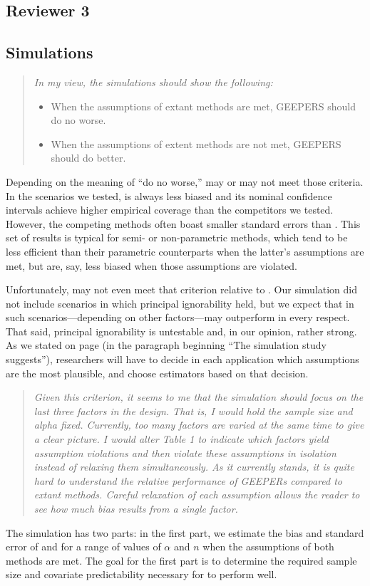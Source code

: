 \documentclass[]{article}
\newenvironment{itquote}
  {\begin{quote} \itshape}
  {\end{quote}\ignorespacesafterend}
\begin{document}
\begin{enumerate}
\section{Reviewer 3}


\subsection{Simulations}
\begin{itquote}
    In my view, the simulations should show the following:
\begin{itemize}
   \item When the assumptions of extant methods are met, GEEPERS should do no worse.
   \item When the assumptions of extent methods are not met, GEEPERS should do better.
\end{itemize}
\end{itquote}
Depending on the meaning of ``do no worse,'' \geepers may or may not meet those criteria. 
In the scenarios we tested, \geepers is always less biased and its nominal confidence intervals achieve higher empirical coverage than the competitors we tested.
However, the competing methods often boast smaller standard errors than \geepers. 
This set of results is typical for semi- or non-parametric methods, which tend to be less efficient than their parametric counterparts when the latter's assumptions are met, but are, say, less biased when those assumptions are violated.

Unfortunately, \geepers may not even meet that criterion relative to \psw. Our simulation did not include scenarios in which principal ignorability held, but we expect that in such scenarios---depending on other factors---\psw may outperform \geepers in every respect. 
That said, principal ignorability is untestable and, in our opinion, rather strong. 
As we stated on page \pageref{evalMetric} (in the paragraph beginning ``The simulation study suggests''), researchers will have to decide in each application which assumptions are the most plausible, and choose estimators based on that decision. 

\begin{itquote} Given this criterion, it seems to me that the simulation should focus on the last three factors in the design.  That is, I would hold the sample size and alpha fixed.  Currently, too many factors are varied at the same time to give a clear picture.  
I would alter Table 1 to indicate which factors yield assumption violations and then violate these assumptions in isolation instead of relaxing them simultaneously.  As it currently stands, it is quite hard to understand the relative performance of GEEPERs compared to extant methods. Careful relaxation of each assumption allows the reader to see how much bias results from a single factor. 
\end{itquote}
The simulation has two parts: in the first part, we estimate the bias and standard error of \geepers and \pmm for a range of values of $\alpha$ and $n$ when the assumptions of both methods are met.
The goal for the first part is to determine the required sample size and covariate predictability necessary for \geepers to perform well. 


\end{enumerate}
\end{document}
